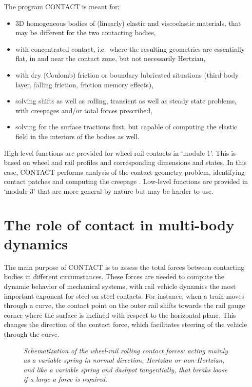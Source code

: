\documentclass[12pt]{report}
\begin{document}
The program CONTACT is meant for:
\begin{itemize}
\item 3D homogeneous bodies of (linearly) elastic and viscoelastic
        materials, that may be different for the two contacting bodies,
\item with concentrated contact, i.e.\ where the resulting geometries are
        essentially flat, in and near the contact zone, but not necessarily
        Hertzian,
\item with dry (Coulomb) friction or boundary lubricated situations
        (third body layer, falling friction, friction memory effects),
\item solving shifts as well as rolling, transient as well as steady state
        problems, with creepages and/or total forces prescribed,
\item solving for the surface tractions first, but capable of computing the
        elastic field in the interiors of the bodies as well.
\end{itemize}
High-level functions are provided for wheel-rail contacts in `module 1'.
This is based on wheel and rail profiles and corresponding dimensions and
states. In this case, CONTACT performs analysis of the contact geometry
problem, identifying contact patches and computing the creepage
\cite{Vollebregt2020b-wrgeom,Vollebregt2020c-distr-force}. Low-level
functions are provided in `module 3' that are more general by nature but
may be harder to use.

\section{The role of contact in multi-body dynamics}

The main purpose of CONTACT is to assess the total forces between
contacting bodies in different circumstances. These forces are needed to
compute the dynamic behavior of mechanical systems, with rail vehicle
dynamics the most important exponent for steel on steel contacts. For
instance, when a train moves through a curve, the contact
point on the outer rail shifts towards the rail gauge corner where the
surface is inclined with respect to the horizontal plane. This changes the
direction of the contact force, which facilitates steering of the vehicle
through the curve.

\begin{figure}[bt]
\centering
{}
\caption{\em Schematization of the wheel-rail rolling contact forces:
acting mainly as a variable spring in normal direction, Hertzian or
non-Hertzian, and like a variable spring and dashpot tangentially, that
breaks loose if a large a force is required.}
\label{fig:dashpot}
\end{figure}
\end{document}
